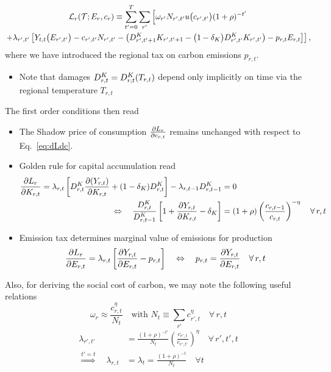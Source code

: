 \documentclass[preprint,3p,authoryear]{elsarticle}
\begin{document}
\begin{multline}
  \label{eq:LKAreg} \mathcal{L}_r(\mathcal{T};E_r,c_r)\equiv\sum_{t'=0}^{T}\sum_{r'}\left[\omega_{r'}N_{r',t'}u\big(c_{r',t'}\big)(1+\rho)^{-t'}\right.\\
  \left.+\lambda_{r',t'}\left[Y_{t,t}\big(E_{r',t'}\big) -c_{r',t'}N_{r',t'}-\left(D^K_{r',t'+1}K_{r',t'+1}-\big(1-\delta_K\big)D^K_{r',t'}K_{r',t'}\right)-p_{r,t}E_{r,t} \right]\right],
\end{multline}
where we have introduced the regional tax on carbon emissions $p_{r,t}$.
\begin{itemize}
\item Note that damages $D^K_{r,t}=D^K_{r,t}(T_{r,t})$ depend only implicitly on time via the regional temperature $T_{r,t}$
\end{itemize}
The first order conditions then read
\begin{itemize}
\item The Shadow price of consumption $\frac{\partial L_r}{\partial c_{r,t}}$ remains unchanged with respect to Eq.~\eqref{eq:dLdc}.

\item Golden rule for capital accumulation read
  \begin{align} \frac{\partial L_r}{\partial K_{r,t}}=\lambda_{r,t}\left[D^K_{r,t}\frac{\partial(Y_{r,t})}{\partial K_{r,t}}+(1-\delta_K)D^K_{r,t}\right]-\lambda_{r,t-1}D^K_{r,t-1}&= 0\notag\\
    \Leftrightarrow\quad \frac{D^K_{r,t}}{D^K_{r,t-1}}\left[1+\frac{\partial Y_{r,t}}{\partial K_{r,t}}-\delta_K\right] &= (1+\rho)\left(\frac{c_{r,t-1}}{c_{r,t}}\right)^{-\eta}\quad\forall\, r,t \label{eq:dLdK}
  \end{align}
\item Emission tax determines marginal value of emissions for production  
  \begin{equation}
    \label{eq:dLdE} \frac{\partial L_r}{\partial E_{r,t}}=\lambda_{r,t}\left[\frac{\partial Y_{r,t}}{\partial E_{r,t}}-p_{r,t}\right]\quad\Leftrightarrow\quad p_{r,t}=\frac{\partial Y_{r,t}}{\partial E_{r,t}} \quad\forall\,r,t 
  \end{equation}
\end{itemize}

Also, for deriving the social cost of carbon, we may note the following useful relations 
\begin{equation}
  \label{eq:Negishi}
  \omega_{r}\approx \frac{c_{r,t}^{\eta}}{N_{t}}\quad\text{with }N_t\equiv\sum_{r'}c_{r',t}^{\eta} \quad\forall\,r,t
\end{equation}
\begin{subequations}
  \label{eq:lambda}
\begin{align} \lambda_{r',t'}&=\frac{(1+\rho)^{-t'}}{N_t}\left(\frac{c_{r',t}}{c_{r',t'}}\right)^{\eta}\quad\forall\, r',t',t\label{subeq:delta_rptp}\\
  \overset{t'=t}{\Rightarrow}\quad
  \lambda_{r,t}&=\lambda_{t}=\frac{(1+\rho)^{-t}}{N_t}\quad \forall t\label{subeq:delta_rt}
\end{align}
\end{subequations}
\end{document}

